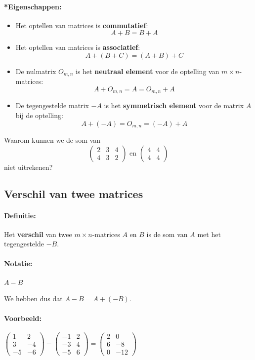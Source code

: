 \documentclass[12pt,twoside]{article}
\begin{document}
\paragraph*{*Eigenschappen:}\mbox{}

\begin{itemize}
\item Het optellen van matrices is {\bf commutatief}:
  $$A+B = B+A$$
\item Het optellen van matrices is {\bf associatief}:
  $$A + (B + C) = (A + B) + C$$
\item De nulmatrix $O_{m,n}$ is het {\bf neutraal element} voor de optelling van $m \times n$-matrices:
  $$A + O_{m,n} = A = O_{m,n} + A$$
\item De tegengestelde matrix $-A$ is het {\bf symmetrisch element} voor de matrix $A$ bij de optelling:
  $$A + (-A) = O_{m,n} = (-A) + A$$
\end{itemize}

\begin{oefening}
  Waarom kunnen we de som van
  $$
  \begin{pmatrix}
    2 & 3 & 4\\
    4 & 3 & 2
  \end{pmatrix}
  \mbox{ en }
  \begin{pmatrix}
    4 & 4\\
    4 & 4
  \end{pmatrix}
  $$
  niet uitrekenen?
\end{oefening}

\subsection{Verschil van twee matrices}

\paragraph*{Definitie:} Het {\bf verschil} van twee $m \times n$-matrices $A$ en $B$ is de som van $A$ met het tegengestelde $-B$.

\paragraph*{Notatie:} $A - B$

We hebben dus dat $A - B = A + (-B)$.

\paragraph*{Voorbeeld:}
$
\begin{pmatrix}
  1 & 2\\
  3 & -4\\
  -5 & -6
\end{pmatrix}
-
\begin{pmatrix}
  -1 & 2\\
  -3 & 4\\
  -5 & 6
\end{pmatrix}
=
\begin{pmatrix}
  2 & 0\\
  6 & -8\\
  0 & -12
\end{pmatrix}
$
\end{document}
